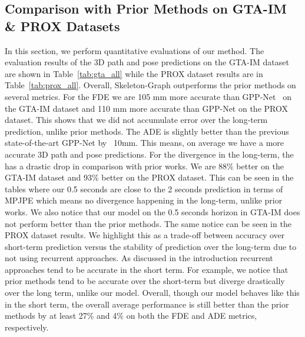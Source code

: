\documentclass[10pt,twocolumn,letterpaper]{article}
\newcommand*{\ours}{Skeleton-Graph }
\begin{document}
\subsection{Comparison with Prior Methods on GTA-IM \& PROX Datasets}
In this section, we perform quantitative evaluations of our method. The evaluation results of the 3D path and pose predictions on the GTA-IM dataset are shown in Table~\ref{tab:gta_all} while the PROX dataset results are in Table~\ref{tab:prox_all}. Overall, \ours outperforms the prior methods on several metrics. For the FDE we are 105 mm more accurate than GPP-Net~\cite{cao2020long} on the GTA-IM dataset and 110 mm more accurate than GPP-Net on the PROX dataset. This shows that we did not accumulate error over the long-term prediction, unlike prior methods. The ADE is slightly better than the previous state-of-the-art GPP-Net by ~10mm. This means, on average we have a more accurate 3D path and pose predictions. For the divergence in the long-term, the  has a drastic drop in comparison with prior works. We are 88\% better on the GTA-IM dataset and 93\% better on the PROX dataset. This can be seen in the tables where our 0.5 seconds are close to the 2 seconds prediction in terms of MPJPE which means no divergence happening in the long-term, unlike prior works. We also notice that our model on the 0.5 seconds horizon in GTA-IM does not perform better than the prior methods. The same notice can be seen in the PROX dataset results. We highlight this as a trade-off between accuracy over short-term prediction versus the stability of prediction over the long-term due to not using recurrent approaches. As discussed in the introduction recurrent approaches tend to be accurate in the short term. For example, we notice that prior methods tend to be accurate over the short-term but diverge drastically over the long term, unlike our model. Overall, though our model behaves like this in the short term, the overall average performance is still better than the prior methods by at least 27\% and 4\% on both the FDE and ADE metrics, respectively.
\end{document}
